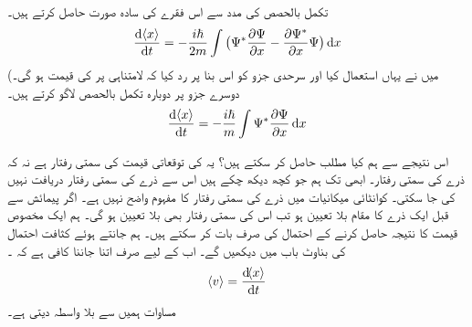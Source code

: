 تکمل بالحصص  کی مدد سے اس فقرے کی سادہ  صورت حاصل کرتے ہیں۔
\begin{align}
\frac{\dif\, \langle x \rangle}{\dif{t}}=-\frac{i\hslash}{2m}\int\big (\Psi^*\frac{\partial{\Psi}}{\partial{x}}-\frac{\partial{\Psi^*}}{\partial{x}}\Psi \big)\dif{x}
\end{align}
(میں نے یہاں  استعمال کیا اور سرحدی جزو کو اس بنا پر رد کیا کہ  لامتناہی پر  کی قیمت   ہو گی۔ دوسرے جزو پر  دوبارہ تکمل بالحصص لاگو کرتے ہیں۔
\begin{align}\label{مساوات_تفاعل_موج_توقعاتی_قیمت_رفتار}
\frac{\dif \,\langle x \rangle}{\dif{t}}=-\frac{i\hslash}{m}\int\Psi^*\frac{\partial{\Psi}}{\partial{x}} \dif{x}
\end{align}

اس نتیجے سے ہم کیا مطلب حاصل کر سکتے ہیں؟ یہ   کی توقعاتی قیمت کی سمتی رفتار ہے نہ کہ  ذرے  کی سمتی رفتار۔  ابھی تک ہم جو کچھ دیکھ چکے ہیں اس سے ذرے کی سمتی رفتار دریافت نہیں کی جا سکتی۔ کوانٹائی میکانیات میں ذرے کی  سمتی رفتار کا مفہوم واضح  نہیں ہے۔ اگر پیمائش سے قبل ایک ذرے کا مقام  بلا تعیین  ہو تب اس کی سمتی رفتار بھی بلا  تعیین ہو گی۔ ہم ایک مخصوص قیمت کا نتیجہ حاصل کرنے کے احتمال کی صرف بات کر سکتے ہیں۔ ہم  جانتے ہوئے کثافت احتمال کی بناوٹ باب  میں دیکھیں گے۔ اب کے لیے صرف اتنا جاننا کافی ہے کہ  ۔
\begin{align}\label{مساوات_تفاعل_موج_تعریف_رفتار}
\langle v \rangle=\frac{\dif\langle x \rangle}{\dif{t}}
\end{align}
مساوات  ہمیں  سے بلا واسطہ  دیتی ہے۔ 

